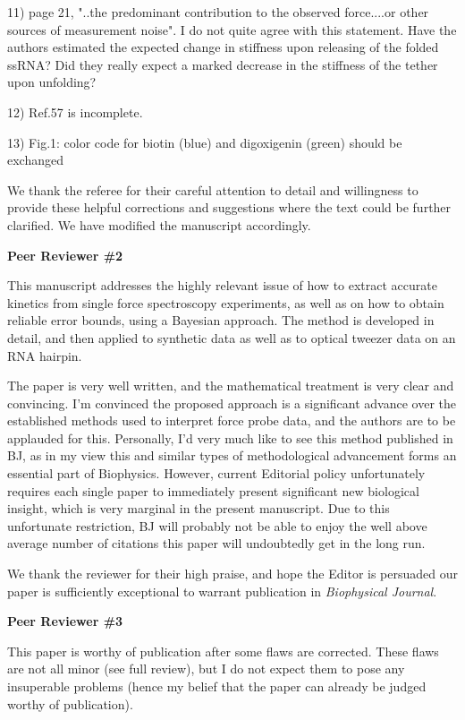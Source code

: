 \documentclass[ucb,qb3,10pt,fullfrom]{ucletter}
\begin{document}
\begin{letter}{}
11) page 21, "..the predominant contribution to the observed force....or other sources of measurement noise". I do not quite agree with this statement. Have the authors estimated the expected change in stiffness upon releasing of the folded ssRNA? Did they really expect a marked decrease in the stiffness of the tether upon unfolding?

12) Ref.57 is incomplete. 

13) Fig.1: color code for biotin (blue) and digoxigenin (green) should be exchanged
\color{black}

We thank the referee for their careful attention to detail and willingness to provide these helpful corrections and suggestions where the text could be further clarified.
We have modified the manuscript accordingly.

\color{red}
{\bf Peer Reviewer \#2}

This manuscript addresses the highly relevant issue of how to extract accurate kinetics from single force spectroscopy experiments, as well as on how to obtain reliable error bounds, using a Bayesian approach. The method is developed in detail, and then applied to synthetic data as well as to optical tweezer data on an RNA hairpin.

The paper is very well written, and the mathematical treatment is very clear and convincing. I'm convinced the proposed approach is a significant advance over the established methods used to interpret force probe data, and the authors are to be applauded for this. Personally, I'd very much like to see this method published in BJ, as in my view this and similar types of methodological advancement forms an essential part of Biophysics. However, current Editorial policy unfortunately requires each single paper to immediately present significant new biological insight, which is very marginal in the present manuscript. Due to this unfortunate restriction, BJ will probably not be able to enjoy the well above average number of citations this paper will undoubtedly get in the long run.
\color{black}

We thank the reviewer for their high praise, and hope the Editor is persuaded our paper is sufficiently exceptional to warrant publication in \emph{Biophysical Journal}.

\color{red}
{\bf Peer Reviewer \#3} %

This paper is worthy of publication after some flaws are corrected. These flaws are not all minor (see full review), but I do not expect them to pose any insuperable problems (hence my belief that the paper can already be judged worthy of publication).


\end{letter}
\end{document}
